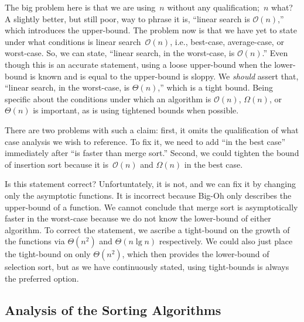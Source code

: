 The big problem here is that we are using~$n$ without any qualification;~$n$ what? 
A slightly better, but still poor, way to phrase it is, ``linear search is $\mathcal{O}(n)$,'' which introduces the upper-bound. 
The problem now is that we have yet to state under what conditions is linear search~$\mathcal{O}(n)$, i.e., best-case, average-case, or worst-case. 
So, we can state, ``linear search, in the worst-case, is $\mathcal{O}(n)$.'' 
Even though this is an accurate statement, using a loose upper-bound when the lower-bound is known and is equal to the upper-bound is sloppy. 
We \emph{should} assert that, ``linear search, in the worst-case, is $\Theta(n)$,'' which is a tight bound. 
Being specific about the conditions under which an algorithm is $\mathcal{O}(n)$, $\Omega(n)$, or $\Theta(n)$ is important, as is using tightened bounds when possible.

There are two problems with such a claim: first, it omits the qualification of what case analysis we wish to reference. 
To fix it, we need to add ``in the best case'' immediately after ``is faster than merge sort.'' 
Second, we could tighten the bound of insertion sort because it is~$\mathcal{O}(n)$ and $\Omega(n)$ in the best case.

Is this statement correct? 
Unfortuntately, it is not, and we can fix it by changing only the asymptotic functions. 
It is incorrect because Big-Oh only describes the upper-bound of a function. 
We cannot conclude that merge sort is asymptotically faster in the worst-case because we do not know the lower-bound of either algorithm. 
To correct the statement, we ascribe a tight-bound on the growth of the functions via $\Theta(n^2)$ and $\Theta(n\lg{n})$ respectively. 
We could also just place the tight-bound on only $\Theta(n^2)$, which then provides the lower-bound of selection sort, but as we have continuously stated, using tight-bounds is always the preferred option.

\subsection{Analysis of the Sorting Algorithms}

